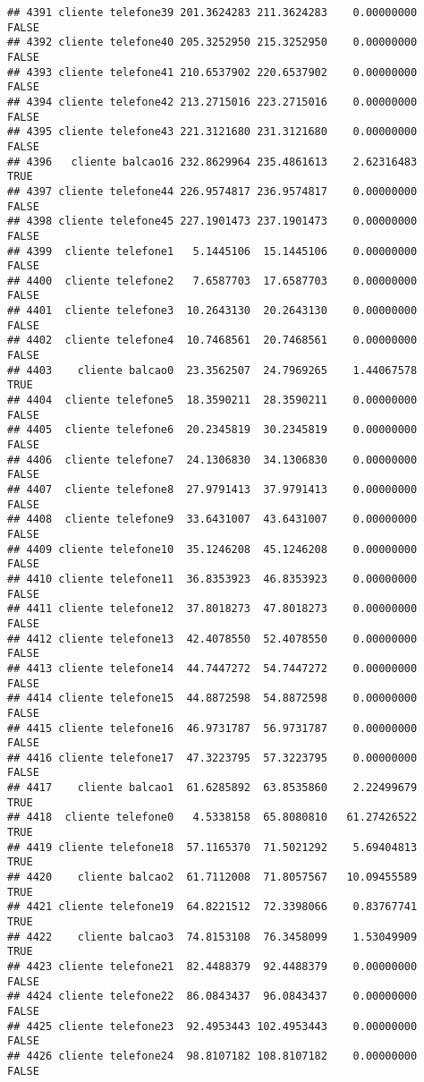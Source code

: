\documentclass[
]{article}
\begin{document}
\begin{verbatim}
## 4391 cliente telefone39 201.3624283 211.3624283    0.00000000    FALSE
## 4392 cliente telefone40 205.3252950 215.3252950    0.00000000    FALSE
## 4393 cliente telefone41 210.6537902 220.6537902    0.00000000    FALSE
## 4394 cliente telefone42 213.2715016 223.2715016    0.00000000    FALSE
## 4395 cliente telefone43 221.3121680 231.3121680    0.00000000    FALSE
## 4396   cliente balcao16 232.8629964 235.4861613    2.62316483     TRUE
## 4397 cliente telefone44 226.9574817 236.9574817    0.00000000    FALSE
## 4398 cliente telefone45 227.1901473 237.1901473    0.00000000    FALSE
## 4399  cliente telefone1   5.1445106  15.1445106    0.00000000    FALSE
## 4400  cliente telefone2   7.6587703  17.6587703    0.00000000    FALSE
## 4401  cliente telefone3  10.2643130  20.2643130    0.00000000    FALSE
## 4402  cliente telefone4  10.7468561  20.7468561    0.00000000    FALSE
## 4403    cliente balcao0  23.3562507  24.7969265    1.44067578     TRUE
## 4404  cliente telefone5  18.3590211  28.3590211    0.00000000    FALSE
## 4405  cliente telefone6  20.2345819  30.2345819    0.00000000    FALSE
## 4406  cliente telefone7  24.1306830  34.1306830    0.00000000    FALSE
## 4407  cliente telefone8  27.9791413  37.9791413    0.00000000    FALSE
## 4408  cliente telefone9  33.6431007  43.6431007    0.00000000    FALSE
## 4409 cliente telefone10  35.1246208  45.1246208    0.00000000    FALSE
## 4410 cliente telefone11  36.8353923  46.8353923    0.00000000    FALSE
## 4411 cliente telefone12  37.8018273  47.8018273    0.00000000    FALSE
## 4412 cliente telefone13  42.4078550  52.4078550    0.00000000    FALSE
## 4413 cliente telefone14  44.7447272  54.7447272    0.00000000    FALSE
## 4414 cliente telefone15  44.8872598  54.8872598    0.00000000    FALSE
## 4415 cliente telefone16  46.9731787  56.9731787    0.00000000    FALSE
## 4416 cliente telefone17  47.3223795  57.3223795    0.00000000    FALSE
## 4417    cliente balcao1  61.6285892  63.8535860    2.22499679     TRUE
## 4418  cliente telefone0   4.5338158  65.8080810   61.27426522     TRUE
## 4419 cliente telefone18  57.1165370  71.5021292    5.69404813     TRUE
## 4420    cliente balcao2  61.7112008  71.8057567   10.09455589     TRUE
## 4421 cliente telefone19  64.8221512  72.3398066    0.83767741     TRUE
## 4422    cliente balcao3  74.8153108  76.3458099    1.53049909     TRUE
## 4423 cliente telefone21  82.4488379  92.4488379    0.00000000    FALSE
## 4424 cliente telefone22  86.0843437  96.0843437    0.00000000    FALSE
## 4425 cliente telefone23  92.4953443 102.4953443    0.00000000    FALSE
## 4426 cliente telefone24  98.8107182 108.8107182    0.00000000    FALSE

\end{verbatim}
\end{document}
